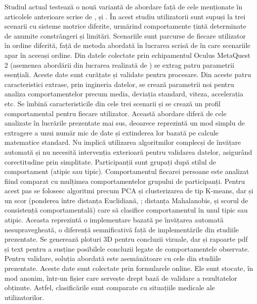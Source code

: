 \documentclass[12pt,a4paper]{report}
\theoremstyle{definition}
\theoremstyle{remark}
\begin{document}
Studiul actual testează o nouă variantă de abordare față de cele menționate în articolele anterioare scrise de \textcite{Afdideh2025}, \textcite{AlcanizRaya2020} și \textcite{Vlasiu2024}. În acest studiu utilizatorii sunt supuși la trei scenarii cu sisteme motrice diferite, urmărind comportamente țintă determinate de anumite constrângeri și limitări. Scenariile sunt parcurse de fiecare utilizator în ordine diferită, față de metoda abordată în lucrarea scrisă de \textcite{AlcanizRaya2020} în care scenariile apar în aceeași ordine. Din datele colectate prin echipamentul Oculus MetaQuest 2 (asemenea abordării din lucrarea realizată de \textcite{Vlasiu2024}) se extrag patru parametrii esențiali. Aceste date sunt curățate și validate pentru procesare. Din aceste patru caracteristici extrase, prin ingineria datelor, se crează parametrii noi pentru analiza comportamentelor precum media, deviația standard, viteza, accelerația etc. Se îmbină caracteristicile din cele trei scenarii și se crează un profil comportamental pentru fiecare utilizator. Această abordare diferă de cele analizate în lucrările prezentate mai sus, deoarece reprezintă un mod simplu de extragere a unui număr mic de date și extinderea lor bazată pe calcule matematice standard. Nu implică utilizarea algoritmilor complecși de învățare automată și nu necesită intervenția exterioară pentru validarea datelor, asigurând corectitudine prin simplitate. Participanții sunt grupați după stilul de comportament (atipic sau tipic). Comportamentul fiecarei persoane este analizat fiind comparat cu mulțimea comportamentelor grupului de participanți. Pentru acest pas se folosesc algoritmi precum PCA și clusterizarea de tip K-means, dar și un scor (ponderea între distanța Euclidiană, \textcite{Liberti2014}; distanța Mahalanobis, \textcite{McLachlan1999} și scorul de consistență comportamentală) care să clasifice comportamentul în unul tipic sau atipic. Aceasta reprezintă o implementare bazată pe învățarea automată nesupravegheată, o diferență semnificativă față de implementările din studiile prezentate. Se generează ploturi 3D pentru concluzii vizuale, dar și rapoarte pdf și text pentru a susține posibilele concluzii legate de comportamentele observate. Pentru validare, soluția abordată este asemănătoare cu cele din studiile prezentate. Aceste date sunt colectate prin formularele online. Ele sunt stocate, în mod anonim, într-un fișier care servește drept bază de validare a rezultatelor obținute. Astfel, clasificările sunt comparate cu situațiile medicale ale utilizatorilor. 
\end{document}
